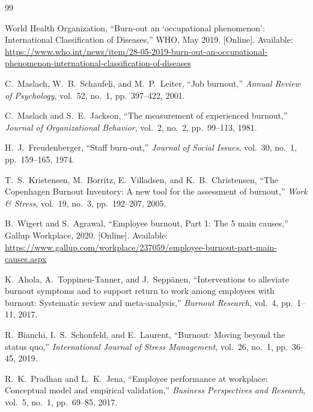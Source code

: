 \documentclass[12pt,a4paper]{article}
\begin{document}
\begin{thebibliography}{99}
\setlength{\itemsep}{0.5\baselineskip}


World Health Organization, ``Burn-out an `occupational phenomenon':
International Classification of Diseases,'' WHO, May 2019. [Online].
Available:
\url{https://www.who.int/news/item/28-05-2019-burn-out-an-occupational-phenomenon-international-classification-of-diseases}

C.~Maslach, W.~B.~Schaufeli, and M.~P.~Leiter, ``Job burnout,''
\textit{Annual Review of Psychology}, vol.~52, no.~1, pp.~397--422, 2001.

C.~Maslach and S.~E.~Jackson, ``The measurement of experienced burnout,''
\textit{Journal of Organizational Behavior}, vol.~2, no.~2, pp.~99--113,
1981.

H.~J.~Freudenberger, ``Staff burn-out,'' \textit{Journal of Social Issues},
vol.~30, no.~1, pp.~159--165, 1974.

T.~S.~Kristensen, M.~Borritz, E.~Villadsen, and K.~B.~Christensen,
``The Copenhagen Burnout Inventory: A new tool for the assessment of
burnout,'' \textit{Work \& Stress}, vol.~19, no.~3, pp.~192--207, 2005.

B.~Wigert and S.~Agrawal, ``Employee burnout, Part 1: The 5 main causes,''
Gallup Workplace, 2020. [Online]. Available:
\url{https://www.gallup.com/workplace/237059/employee-burnout-part-main-causes.aspx}

K.~Ahola, A.~Toppinen-Tanner, and J.~Seppänen, ``Interventions to
alleviate burnout symptoms and to support return to work among employees
with burnout: Systematic review and meta-analysis,'' \textit{Burnout
Research}, vol.~4, pp.~1--11, 2017.

R.~Bianchi, I.~S.~Schonfeld, and E.~Laurent, ``Burnout: Moving beyond
the status quo,'' \textit{International Journal of Stress Management},
vol.~26, no.~1, pp.~36--45, 2019.

R.~K.~Pradhan and L.~K.~Jena, ``Employee performance at workplace:
Conceptual model and empirical validation,'' \textit{Business Perspectives
and Research}, vol.~5, no.~1, pp.~69--85, 2017.



\end{thebibliography}
\end{document}
